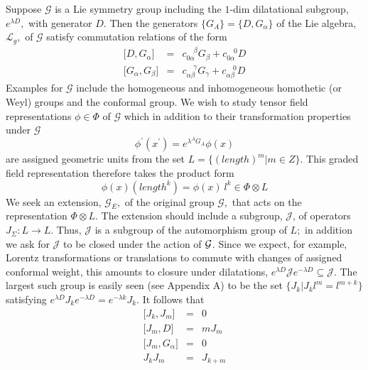 \documentclass[a4paper,12pt]{article}
\begin{document}
Suppose $\mathcal{G}$ is a Lie symmetry group including the $1$-dim
dilatational subgroup, $e^{\lambda D},$ with generator $D.$ Then the
generators $\{G_{A}\}=\{D,G_{\alpha }\}$ of the Lie algebra, $\mathcal{L}%
_{g},$ of $\mathcal{G}$ satisfy commutation relations of the form 
\begin{eqnarray}
\lbrack D,G_{\alpha }] &=&c_{0\alpha }^{\quad \beta }G_{\beta }+c_{0\alpha
}^{\quad 0}D \\
\lbrack G_{\alpha },G_{\beta }] &=&c_{\alpha \beta }^{\quad \gamma
}G_{\gamma }+c_{\alpha \beta }^{\quad 0}D
\end{eqnarray}
Examples for $\mathcal{G}$ include the homogeneous and inhomogeneous
homothetic (or Weyl) groups and the conformal group. We wish to study tensor
field representations $\phi \in \Phi $ of $\mathcal{G}$ which in addition to
their transformation properties under $\mathcal{G}$%
\begin{equation}
\phi ^{\prime }(x^{\prime })=e^{\lambda ^{A}G_{A}}\phi (x)
\end{equation}
are assigned geometric units from the set $L=\{(length)^{m}|m\in Z\}.$ This
graded field representation therefore takes the product form 
\begin{equation}
\phi (x)(length^{k})=\phi (x)\ l^{k}\in \Phi \otimes L
\end{equation}
We seek an extension, $\mathcal{G}_{E},$ of the original group $\mathcal{G},$
that acts on the representation $\Phi \otimes L.$ The extension should
include a subgroup, $\mathcal{J}$, of operators $J_{\Sigma }:L\rightarrow L.$
Thus, $\mathcal{J}$ is a subgroup of the automorphism group of $L;$ in
addition we ask for $\mathcal{J}$ to be closed under the action of $\mathcal{%
G}$. Since we expect, for example, Lorentz transformations or translations
to commute with changes of assigned conformal weight, this amounts to
closure under dilatations, $e^{\lambda D}\mathcal{J}e^{-\lambda D}\subseteq 
\mathcal{J}$. The largest such group is easily seen (see Appendix A) to be
the set $\{J_{k}|J_{k}l^{m}=l^{m+k}\}$ satisfying $e^{\lambda
D}J_{k}e^{-\lambda D}=e^{-\lambda k}J_{k}.$ It follows that 
\begin{eqnarray}
\lbrack J_{k},J_{m}] &=&0 \\
\lbrack J_{m},D] &=&mJ_{m}  \label{J weight} \\
\lbrack J_{m},G_{\alpha }] &=&0 \\
J_{k}J_{m} &=&J_{k+m}  \label{J product}
\end{eqnarray}
\end{document}
